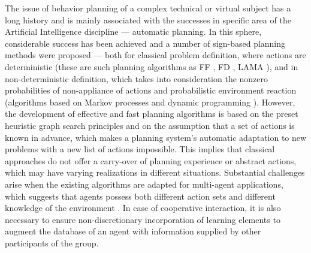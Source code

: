 \documentclass[review]{elsarticle}
\begin{document}
The issue of behavior planning of a complex technical or virtual subject has a long history and is mainly associated with the successes in specific area of the Artificial Intelligence discipline --- automatic planning. In this sphere, considerable success has been achieved and a number of sign-based planning methods were proposed --- both for classical problem definition, where actions are deterministic (these are such planning algorithms as FF \cite{Hoffmann2001}, FD \cite{Helmert2006}, LAMA \cite{Richter2010}), and in non-deterministic definition, which takes into consideration the nonzero probabilities of non-appliance of actions and probabilistic environment reaction (algorithms based on Markov processes and dynamic programming \cite{Barto1995,Bonet2009}). However, the development of effective and fast planning algorithms is based on the preset heuristic graph search principles and on the assumption that a set of actions is known in advance, which makes a planning system’s automatic adaptation to new problems with a new list of actions impossible. This implies that classical approaches do not offer a carry-over of planning experience or abstract actions, which may have varying realizations in different situations. Substantial challenges arise when the existing algorithms are adapted for multi-agent applications, which suggests that agents possess both different action sets and different knowledge of the environment \cite{Brafman2015}. In case of cooperative interaction, it is also necessary to ensure non-discretionary incorporation of learning elements to augment the database of an agent with information supplied by other participants of the group.
\end{document}
